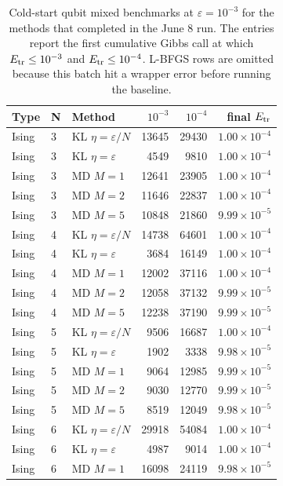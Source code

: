 \begin{table}[t]
\centering
\scriptsize
\caption{Cold-start qubit mixed benchmarks at $\varepsilon=10^{-3}$ for the methods that completed in the June 8 run. The entries report the first cumulative Gibbs call at which $E_{\rm tr}\le 10^{-3}$ and $E_{\rm tr}\le 10^{-4}$. L-BFGS rows are omitted because this batch hit a wrapper error before running the baseline.}
\label{tab:0608-cold-qubit-scaling-available}
\begin{tabular}{lllrrr}
\toprule
Type & N & Method & $10^{-3}$ & $10^{-4}$ & final $E_{\rm tr}$ \\
\midrule
Ising & 3 & KL $\eta=\varepsilon/N$ & 13645 & 29430 & $1.00\times 10^{-4}$ \\
Ising & 3 & KL $\eta=\varepsilon$ & 4549 & 9810 & $1.00\times 10^{-4}$ \\
Ising & 3 & MD $M=1$ & 12641 & 23905 & $1.00\times 10^{-4}$ \\
Ising & 3 & MD $M=2$ & 11646 & 22837 & $1.00\times 10^{-4}$ \\
Ising & 3 & MD $M=5$ & 10848 & 21860 & $9.99\times 10^{-5}$ \\
\midrule
Ising & 4 & KL $\eta=\varepsilon/N$ & 14738 & 64601 & $1.00\times 10^{-4}$ \\
Ising & 4 & KL $\eta=\varepsilon$ & 3684 & 16149 & $1.00\times 10^{-4}$ \\
Ising & 4 & MD $M=1$ & 12002 & 37116 & $1.00\times 10^{-4}$ \\
Ising & 4 & MD $M=2$ & 12058 & 37132 & $9.99\times 10^{-5}$ \\
Ising & 4 & MD $M=5$ & 12238 & 37190 & $9.99\times 10^{-5}$ \\
\midrule
Ising & 5 & KL $\eta=\varepsilon/N$ & 9506 & 16687 & $1.00\times 10^{-4}$ \\
Ising & 5 & KL $\eta=\varepsilon$ & 1902 & 3338 & $9.98\times 10^{-5}$ \\
Ising & 5 & MD $M=1$ & 9064 & 12985 & $9.99\times 10^{-5}$ \\
Ising & 5 & MD $M=2$ & 9030 & 12770 & $9.99\times 10^{-5}$ \\
Ising & 5 & MD $M=5$ & 8519 & 12049 & $9.98\times 10^{-5}$ \\
\midrule
Ising & 6 & KL $\eta=\varepsilon/N$ & 29918 & 54084 & $1.00\times 10^{-4}$ \\
Ising & 6 & KL $\eta=\varepsilon$ & 4987 & 9014 & $1.00\times 10^{-4}$ \\
Ising & 6 & MD $M=1$ & 16098 & 24119 & $9.98\times 10^{-5}$ \\

\end{tabular}
\end{table}
